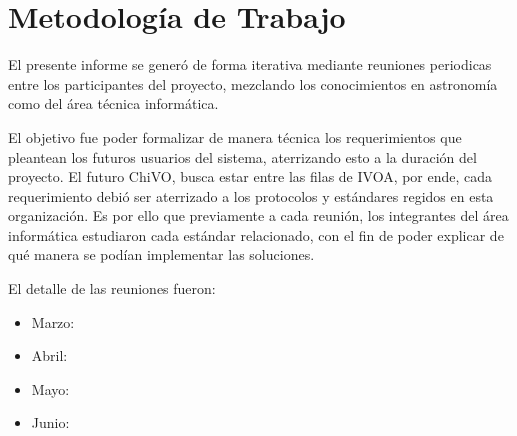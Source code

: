 \section{Metodología de Trabajo}

El presente informe se generó de forma iterativa mediante reuniones periodicas
entre los participantes del proyecto, mezclando los conocimientos en astronomía
como del área técnica informática.

El objetivo fue poder formalizar de manera técnica los requerimientos que
pleantean los futuros usuarios del sistema, aterrizando esto a la duración del
proyecto. El futuro ChiVO, busca estar entre las filas de IVOA, por ende, cada
requerimiento debió ser aterrizado a los protocolos y estándares regidos en
esta organización. Es por ello que previamente a cada reunión, los integrantes
del área informática estudiaron cada estándar relacionado, con el fin de poder
explicar de qué manera se podían implementar las soluciones.

El detalle de las reuniones fueron:
\begin{itemize}
	\item Marzo:
	\item Abril:
	\item Mayo:
	\item Junio:
\end{itemize}
